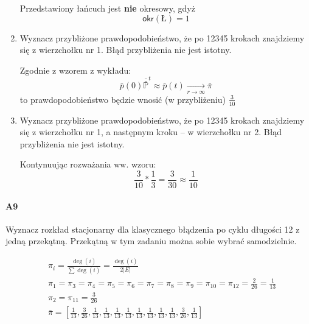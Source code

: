 \documentclass[a4paper,12pt]{article}
\theoremstyle{definition}%
\theoremstyle{definition}
\theoremstyle{problem}
\begin{document}
\begin{enumerate}[label=\alph*)]
Przedstawiony łańcuch jest \textbf{nie} okresowy, gdyż
$$\mathsf{okr}(Ł)=1$$
\item Wyznacz przybliżone prawdopodobieństwo, że po 12345 krokach znajdziemy się z wierzchołku nr 1. Błąd przybliżenia nie jest istotny.

Zgodnie z wzorem z wykładu:
$$\bar{p}(0)\bar{\bar{\mathbb{P}}}^t\approx\bar{p}(t)\underset{r\rightarrow \infty}{\rightarrow} \bar{\pi}$$
to prawdopodobieństwo będzie wnosić (w przybliżeniu) $\frac{3}{10}$
\item Wyznacz przybliżone prawdopodobieństwo, że po 12345 krokach znajdziemy się z wierzchołku nr 1, a następnym kroku – w wierzchołku nr 2. Błąd przybliżenia nie jest istotny.

Kontynuując rozważania ww. wzoru:
$$\frac{3}{10}*\frac{1}{3}=\frac{3}{30}\approx\frac{1}{10}$$
\end{enumerate}

\paragraph{A9} Wyznacz rozkład stacjonarny dla klasycznego błądzenia po cyklu długości 12 z jedną przekątną. Przekątną w tym zadaniu można sobie wybrać samodzielnie.
\begin{figure}[H]
\centering
{}
\end{figure}
\begin{align*}
&\pi _{i}=\frac{\deg (i)}{\sum \deg (i)}=\frac{\deg (i)}{2|E|}\\
&\pi _{1}=\pi _{3}=\pi _{4}=\pi _{5}=\pi _{6}=\pi _{7}=\pi _{8}=\pi _{9}=\pi _{10}=\pi _{12}=\frac{2}{26}=\frac{1}{13}\\
&\pi _{2}=\pi _{11}=\frac{3}{26}\\
&\bar{\pi}=\left[\frac{1}{13},\frac{3}{26},\frac{1}{13},\frac{1}{13},\frac{1}{13},\frac{1}{13},\frac{1}{13},\frac{1}{13},\frac{1}{13},\frac{1}{13},\frac{3}{26},\frac{1}{13}\right]
\end{align*}
\end{document}
